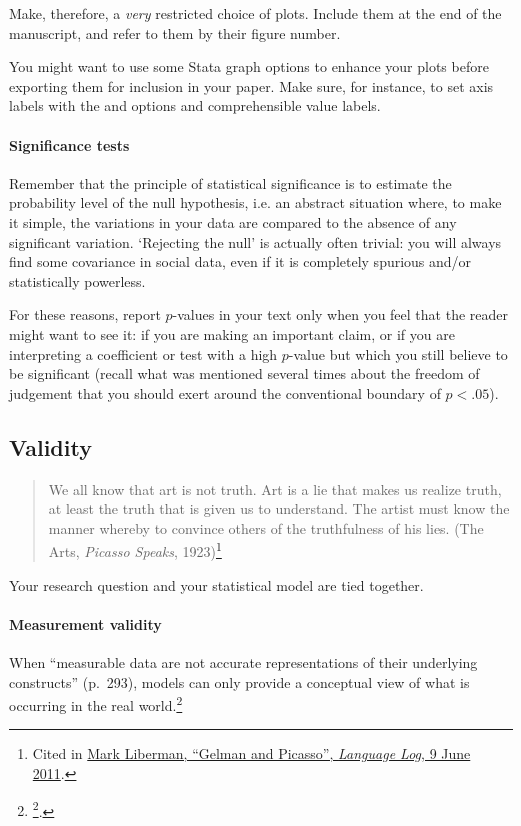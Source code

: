   Make, therefore, a \emph{very} restricted choice of plots. Include them at the end of the manuscript, and refer to them by their figure number.%

  You might want to use some Stata graph options to enhance your plots before exporting them for inclusion in your paper. Make sure, for instance, to set axis labels with the  and  options and comprehensible value labels.%

\paragraph{Significance tests} Remember that the principle of statistical significance is to estimate the probability level of the null hypothesis, i.e. an abstract situation where, to make it simple, the variations in your data are compared to the absence of any significant variation. `Rejecting the null' is actually often trivial: you will always find some covariance in social data, even if it is completely spurious and/or statistically powerless.%

  For these reasons, report $p$-values in your text only when you feel that the reader might want to see it: if you are making an important claim, or if you are interpreting a coefficient or test with a high $p$-value but which you still believe to be significant (recall what was mentioned several times about the freedom of judgement that you should exert around the conventional boundary of $p < .05$).%

\subsection{Validity}

\begin{quote}
	We all know that art is not truth. Art is a lie that makes us realize truth, at least the truth that is given us to understand. The artist must know the manner whereby to convince others of the truthfulness of his lies. (The Arts, \emph{Picasso Speaks}, 1923)\footnote{Cited in \href{http://languagelog.ldc.upenn.edu/nll/?p=3103}{Mark Liberman, ``Gelman and Picasso'', \emph{Language Log}, 9 June 2011}.}
\end{quote}

Your research question and your statistical model are tied together. 

\paragraph{Measurement validity} When ``measurable data are not accurate representations of their underlying constructs'' (p.~293), models can only provide a conceptual view of what is occurring in the real world.\footnote{\href{http://projecteuclid.org/euclid.ss/1294167961}{\footcite{Shmueli:2010a}}.}

